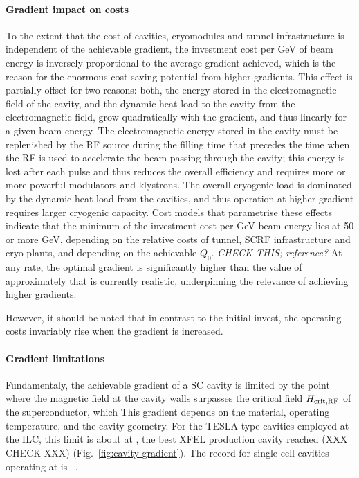 \paragraph{Gradient impact on costs}
To the extent that the cost of cavities, cryomodules and tunnel infrastructure is independent of the achievable gradient, the investment cost per GeV of beam energy is inversely proportional to the average gradient achieved, which is the reason for the enormous cost saving potential from higher gradients.
This effect is partially offset for two reasons: both, the energy stored in the electromagnetic field of the cavity, and the dynamic heat load to the cavity from the electromagnetic field, grow quadratically with the gradient, and thus linearly for a given beam energy.
The electromagnetic energy stored in the cavity must be replenished by the RF source during the filling time that precedes the time when the RF is used to accelerate the beam passing through the cavity; this energy is lost after each pulse and thus reduces the overall efficiency and requires more or more powerful modulators and klystrons.
The overall cryogenic load is dominated by the dynamic heat load from the cavities, and thus operation at higher gradient requires larger cryogenic capacity.
Cost models that parametrise these effects indicate that the minimum of the investment cost per GeV beam energy lies at \num{50} or more GeV, depending on the relative costs of tunnel, SCRF infrastructure and cryo plants, and depending on the achievable $Q_0$. 
{\it CHECK THIS; reference?}
At any rate, the optimal gradient is significantly higher than the value of approximately  that is currently realistic, underpinning the relevance of achieving higher gradients.

However, it should be noted that in contrast to the initial invest, the operating costs invariably rise when the gradient is increased.

\paragraph{Gradient limitations}

Fundamentaly, the achievable gradient of a SC cavity is limited by the point where the magnetic field at the cavity walls surpasses the critical field $H_{\mathrm{crit,RF}}$ of the superconductor, which 
This gradient depends on the material, operating temperature, and the cavity geometry. 
For the TESLA type cavities employed at the ILC, this limit is about  at ,
the best XFEL production cavity reached  (XXX CHECK XXX) (Fig.~\ref{fig:cavity-gradient}).
The record for single cell cavities operating at  is ~\cite{Eremeev:2007zza}.
%

